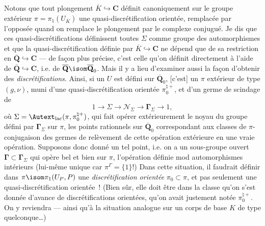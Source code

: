Notons que tout plongement $\overline K\hookrightarrow\mathbf{C}$ définit canoniquement sur le groupe extérieur $\pi= \pi_1(U_{\overline K})$ une quasi-discrétification orientée, remplacée par l'opposée quand on remplace le plongement par le complexe conjugué. Je dis que ces quasi-discrétifications définissent toutes $\Sigma$ comme groupe des automorphismes et que la  quasi-discrétification définie par $\overline K \hookrightarrow \mathbf{C}$ ne dépend que de sa restriction en $\overline{\mathbf{Q}}\hookrightarrow \mathbf{C}$ --- de fa\c{c}on plus précise, c'est celle qu'on définit directement à l'aide de $\overline{\mathbf{Q}}\hookrightarrow \mathbf{C}$, i.e. de $\overline{\mathbf{Q}} \isom \overline{\mathbf{Q}}_0$. Mais il y a lieu d'examiner aussi la fa\c{c}on d'obtenir des \emph{discrétifications}. Ainsi, si un $U$ est défini sur $\overline{\mathbf{Q}}_0$, [c'est] un $\pi$ extérieur de type $(g,\nu)$, muni d'une quasi-discrétification orientée $\pi_0^{\natural +}$, et d'un germe de scindage de
$$
1\to\Sigma\to\mathcal{N}_\Sigma\to\boldsymbol{\Gamma}_\Sigma
\to 1,
$$
où $\Sigma={\Autext}_{\operatorname{lac}}(\pi,\pi_0^{\natural+})$, qui fait opérer extérieurement le noyau du groupe défini par $\boldsymbol{\Gamma}_\Sigma$ sur $\pi$, les points rationnels sur $\overline{\mathbf{Q}}_0$ correspondant aux classes de $\pi$-conjugaison des germes de relèvement de cette opération extérieure en une vraie opération. Supposons donc donné un tel point, i.e. on a un sous-groupe ouvert $\boldsymbol{\Gamma}\subset \boldsymbol{\Gamma}_\Sigma$ qui opère bel et bien sur $\pi$, l'opération définie mod automorphismes intérieurs (lui-même unique car $\pi^\Gamma =\{1\}$!)  Dans cette situation, il faudrait définir dans $\pi \isom \pi_1(U_P,P)$ une \emph{discrétification orientée} $\pi_0\subset \pi$, et pas seulement une quasi-discrétification orientée~! (Bien sûr, elle doit être dans la classe qu'on s'est donnée d'avance de discrétifications orientées, qu'on avait justement notée $\pi_0^{\natural+}$. On y reviendra --- ainsi qu'à la situation analogue sur un corps de base $K$ de type quelconque\dots)

